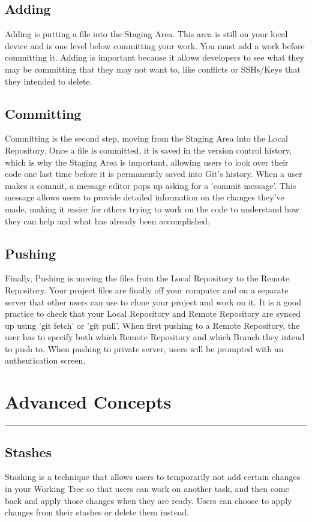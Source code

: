 \documentclass{article}
\begin{document}
\subsection*{Adding}
Adding is putting a file into the Staging Area. This area is still on your local device and is one level below committing your work. You must add a work before committing it. Adding is important because it allows developers to see what they may be committing that they may not want to, like conflicts or SSHs/Keys that they intended to delete.
\vspace{15pt}
\subsection*{Committing}
Committing is the second step, moving from the Staging Area into the Local Repository. Once a file is committed, it is saved in the version control history, which is why the Staging Area is important, allowing users to look over their code one last time before it is permanently saved into Git's history. When a user makes a commit, a message editor pops up asking for a 'commit message'. This message allows users to provide detailed information on the changes they've made, making it easier for others trying to work on the code to understand how they can help and what has already been accomplished.
\vspace{15pt}
\subsection*{Pushing}
Finally, Pushing is moving the files from the Local Repository to the Remote Repository. Your project files are finally off your computer and on a separate server that other users can use to clone your project and work on it. It is a good practice to check that your Local Repository and Remote Repository are synced up using 'git fetch' or 'git pull'. When first pushing to a Remote Repository, the user has to specify both which Remote Repository and which Branch they intend to push to. When pushing to private server, users will be prompted with an authentication screen. 
\vspace{55pt}

\section*{Advanced Concepts}
\hrule
\vspace{15pt}

\subsection*{Stashes}
Stashing is a technique that allows users to temporarily not add certain changes in your Working Tree so that users can work on another task, and then come back and apply those changes when they are ready. Users can choose to apply changes from their stashes or delete them instead.
\end{document}
